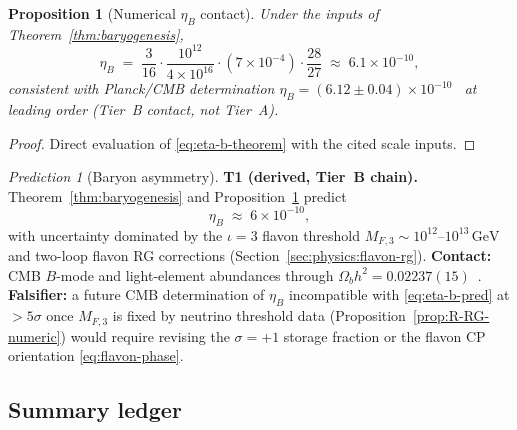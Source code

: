 \documentclass[11pt]{article}
\theoremstyle{plain}
\newtheorem{proposition}[theorem]{Proposition}
\theoremstyle{definition}
\theoremstyle{remark}
\newtheorem{prediction}[theorem]{Prediction}
\numberwithin{equation}{section}
\begin{document}
\begin{proposition}[Numerical $\eta_B$ contact]\label{prop:eta-b}
Under the inputs of Theorem~\ref{thm:baryogenesis},
\begin{equation}\label{eq:eta-b-numeric}
  \eta_B
  \;=\;
  \frac{3}{16}\cdot\frac{10^{12}}{4\times 10^{16}}
  \cdot (7\times 10^{-4})\cdot\frac{28}{27}
  \;\approx\;
  6.1\times 10^{-10},
\end{equation}
consistent with Planck/CMB determination
$\eta_B = (6.12\pm 0.04)\times 10^{-10}$~\cite{PDG2025} at leading order
(Tier~B contact, not Tier~A).
\end{proposition}

\begin{proof}
Direct evaluation of \eqref{eq:eta-b-theorem} with the cited scale inputs.
\end{proof}

\begin{prediction}[Baryon asymmetry]\label{pred:eta-b}
\textbf{T1 (derived, Tier~B chain).}
Theorem~\ref{thm:baryogenesis} and Proposition~\ref{prop:eta-b} predict
\begin{equation}\label{eq:eta-b-pred}
  \eta_B \;\approx\; 6\times 10^{-10},
\end{equation}
with uncertainty dominated by the $\iota=3$ flavon threshold
$M_{F,3}\sim 10^{12}$--$10^{13}\,\mathrm{GeV}$ and two-loop flavon RG
corrections (Section~\ref{sec:physics:flavon-rg}). \textbf{Contact:}
CMB $B$-mode and light-element abundances through
$\Omega_b h^2 = 0.02237(15)$~\cite{PDG2025}.
\textbf{Falsifier:} a future CMB determination of $\eta_B$ incompatible with
\eqref{eq:eta-b-pred} at $>5\sigma$ once $M_{F,3}$ is fixed by neutrino
threshold data (Proposition~\ref{prop:R-RG-numeric}) would require revising
the $\sigma=+1$ storage fraction or the flavon CP orientation
\eqref{eq:flavon-phase}.
\end{prediction}

\subsection{Summary ledger}
\label{sec:baryogenesis:table}
\end{document}
